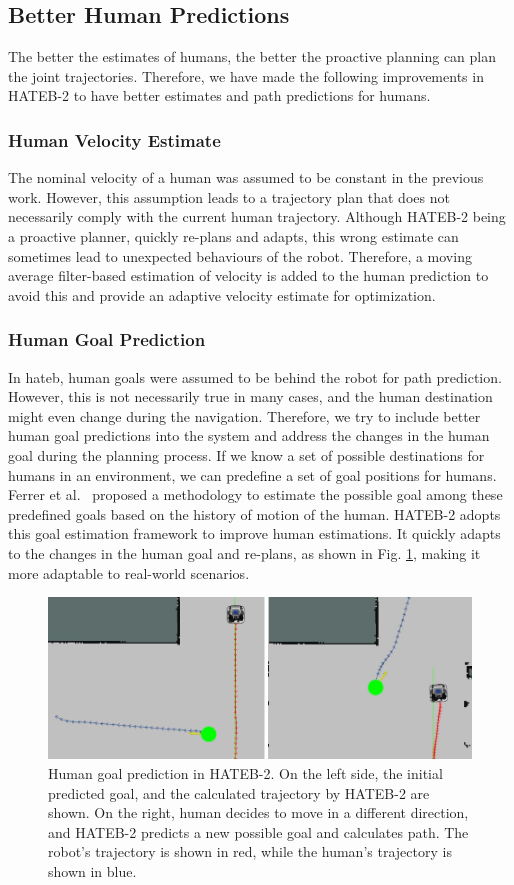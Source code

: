 \subsection{Better Human Predictions}
The better the estimates of humans, the better the proactive planning can plan the joint trajectories. Therefore, we have made the following improvements in HATEB-2 to have better estimates and path predictions for humans.

\subsubsection{Human Velocity Estimate}
The nominal velocity of a human was assumed to be constant in the previous work. However, this assumption leads to a trajectory plan that does not necessarily comply with the current human trajectory. Although HATEB-2 being a proactive planner, quickly re-plans and adapts, this wrong estimate can sometimes lead to unexpected behaviours of the robot. Therefore, a moving average filter-based estimation of velocity is added to the human prediction to avoid this and provide an adaptive velocity estimate for optimization.

\subsubsection{Human Goal Prediction}
In \acrshort{hateb}, human goals were assumed to be behind the robot for path prediction. However, this is not necessarily true in many cases, and the human destination might even change during the navigation. Therefore, we try to include better human goal predictions into the system and address the changes in the human goal during the planning process. If we know a set of possible destinations for humans in an environment, we can predefine a set of goal positions for humans. Ferrer et al.~\cite{ferrer2014bayesian} proposed a methodology to estimate the possible goal among these predefined goals based on the history of motion of the human. HATEB-2 adopts this goal estimation framework to improve human estimations. It quickly adapts to the changes in the human goal and re-plans, as shown in Fig. \ref{goal_predict}, making it more adaptable to real-world scenarios.
\begin{figure}[!h]
\centering
\includegraphics[width=0.9\columnwidth]{images/chapter3/goal_predict_updated.png}
\caption{Human goal prediction in HATEB-2. On the left side, the initial predicted goal, and the calculated trajectory by HATEB-2 are shown. On the right, human decides to move in a different direction, and HATEB-2 predicts a new possible goal and calculates path. The robot's trajectory is shown in red, while the human's trajectory is shown in blue.}
\label{goal_predict}
\end{figure}

